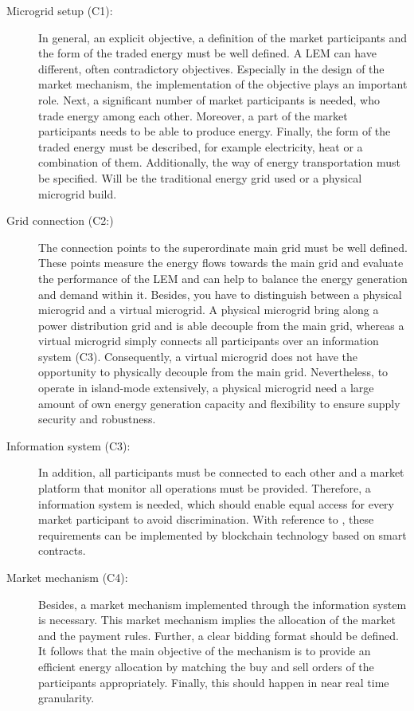 \begin{description}
    \item[Microgrid setup (C1):] In general, an explicit objective, a definition of the market 
     participants and the form of the traded energy must be well defined. 
     A LEM can have different, often contradictory objectives. Especially in the
     design of the market mechanism, the implementation of the objective plays an important role.
     Next, a significant number of market participants is needed, who trade energy among each other.
     Moreover, a part of the market participants needs to be able to produce energy. 
     Finally, the form of the traded energy must be described, for example electricity, heat or a 
     combination of them. Additionally, the way of energy transportation must be specified.
     Will be the traditional energy grid used or a physical microgrid build. 
    
    \item[Grid connection (C2:)] The connection points to the superordinate main grid 
     must be well defined. These points measure the energy flows towards the main grid 
     and evaluate the performance of the LEM and can help to balance the energy generation 
     and demand within it. Besides, you have to distinguish between a physical microgrid and 
     a virtual microgrid. A physical microgrid bring along a power distribution grid and is able
     decouple from the main grid, whereas a virtual microgrid simply connects all participants over 
     an information system (C3). Consequently, a virtual microgrid does not have the opportunity
     to physically decouple from the main grid. 
     Nevertheless, to operate in island-mode extensively, a physical microgrid need a large 
     amount of own energy generation capacity and flexibility to ensure supply security and robustness.
         
    \item[Information system (C3):] In addition, all participants must be connected to each other
    and a market platform that monitor all operations must be provided. 
    Therefore, a information system is needed, which should enable equal 
    access for every market participant to avoid discrimination. 
    With reference to , these requirements
    can be implemented by blockchain technology based on smart contracts.
    
    \item[Market mechanism (C4):] Besides, a market mechanism implemented through 
     the information system is necessary. This market mechanism implies the allocation of the
     market and the payment rules. Further, a clear bidding format should be defined. 
     It follows that the main objective of the mechanism is to provide an efficient
     energy allocation by matching the buy and sell orders of the participants appropriately.
     Finally, this should happen in near real time granularity.    
    

\end{description}
